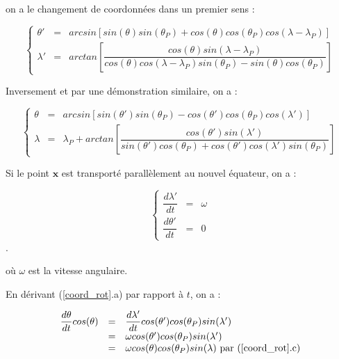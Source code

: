 on a le changement de coordonnées dans un premier sens :

\begin{equation}
\label{from classic to prime}
\left\lbrace 
\begin{array}{rcl}
\theta' & = & arcsin \left[ sin( \theta) sin(\theta_P) + cos( \theta ) cos( \theta_P) cos( \lambda - \lambda_P ) \right] \\
\lambda' & = & arctan \left[ \dfrac{cos ( \theta) sin( \lambda - \lambda_P)}{cos( \theta) cos( \lambda - \lambda_P) sin( \theta_P) - sin( \theta) cos( \theta_P)} \right]
\end{array}
\right.
\end{equation}

Inversement et par une démonstration similaire, on a :

\begin{equation}
\label{from prime to classic}
\left\lbrace 
\begin{array}{rcl}
\theta & = & arcsin \left[ sin( \theta') sin(\theta_P) - cos( \theta' ) cos( \theta_P) cos( \lambda' ) \right] \\
\lambda & = & \lambda_P + arctan \left[ \dfrac{cos ( \theta') sin( \lambda ')}{sin( \theta') cos( \theta_P) + cos ( \theta') cos( \lambda') sin ( \theta_P)} \right]
\end{array}
\right.
\end{equation}

Si le point $\mathbf{x}$ est transporté parallèlement au nouvel équateur, on a :

\begin{equation}
\left\lbrace 
\begin{array}{rcl}
\dfrac{d \lambda'}{dt} & = & \omega \\
\dfrac{d \theta'}{dt} & = & 0
\end{array}
\right.
\end{equation}.

où $\omega$ est la vitesse angulaire.

En dérivant (\ref{coord_rot}.a) par rapport à $t$, on a :

\begin{equation}
\begin{array}{rcl}
\dfrac{d \theta}{dt} cos ( \theta ) & = & \dfrac{d \lambda' }{dt} cos ( \theta' ) cos ( \theta_P) sin( \lambda') \\
 & = & \omega cos ( \theta' ) cos ( \theta_P) sin( \lambda') \\
 & = & \omega cos ( \theta ) cos ( \theta_P) sin( \lambda) \text{ par (\ref{coord_rot}.c)}\\
\end{array}
\end{equation}

